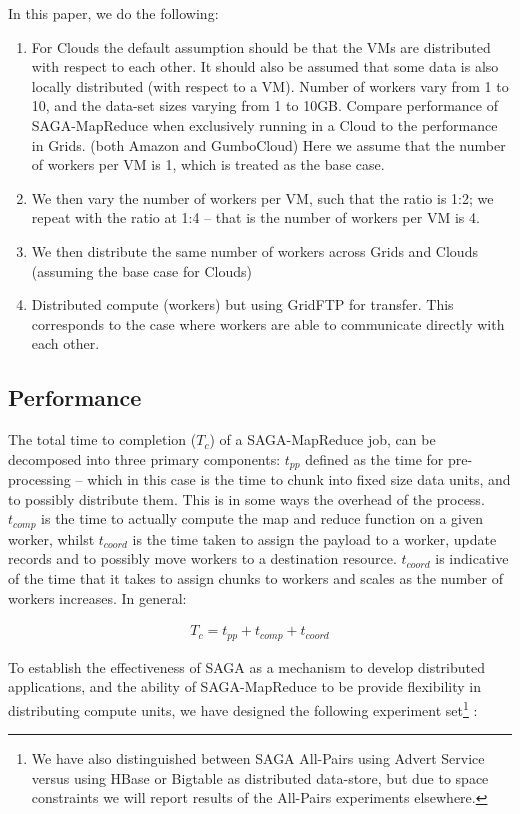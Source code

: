 \documentclass[conference,final]{IEEEtran}
\newcommand{\sagamapreduce }{SAGA-MapReduce }
\begin{document}
In this paper, we do the following:
\begin{enumerate}
\item For Clouds the default assumption should be that the VMs are
  distributed with respect to each other. It should also be assumed
  that some data is also locally distributed (with respect to a VM).
  Number of workers vary from 1 to 10, and the data-set sizes varying
  from 1 to 10GB.  Compare performance of \sagamapreduce when
  exclusively running in a Cloud to the performance in Grids. (both
  Amazon and GumboCloud) Here we assume that the number of workers per
  VM is 1, which is treated as the base case.
\item We then vary the number of workers per VM, such that the ratio
  is 1:2; we repeat with the ratio at 1:4 -- that is the number of
  workers per VM is 4.
\item We then distribute the same number of workers across Grids and
  Clouds (assuming the base case for Clouds)
\item Distributed compute (workers) but using GridFTP for
  transfer. This corresponds to the case where workers are able to
  communicate directly with each other.
\end{enumerate}

\subsection{Performance} The total time to completion ($T_c$) of a
\sagamapreduce job, can be decomposed into three primary components:
$t_{pp}$ defined as the time for pre-processing -- which in this case
is the time to chunk into fixed size data units, and to possibly
distribute them. This is in some ways the overhead of the process.
$t_{comp}$ is the time to actually compute the map and reduce function
on a given worker, whilst $t_{coord}$ is the time taken to assign the
payload to a worker, update records and to possibly move workers to a
destination resource. $t_{coord}$ is indicative of the time that it
takes to assign chunks to workers and scales as the number of workers
increases. In general:

\vspace{-1em}
\begin{eqnarray}
T_c = t_{pp} + t_{comp} + t_{coord}
\end{eqnarray}

To establish the effectiveness of SAGA as a mechanism to develop
distributed applications, and the ability of \sagamapreduce to be
provide flexibility in distributing compute units, we have designed
the following experiment set\footnote{We have also distinguished
  between SAGA All-Pairs using Advert Service versus using HBase or
  Bigtable as distributed data-store, but due to space constraints we
  will report results of the All-Pairs experiments elsewhere.}  :
\end{document}
